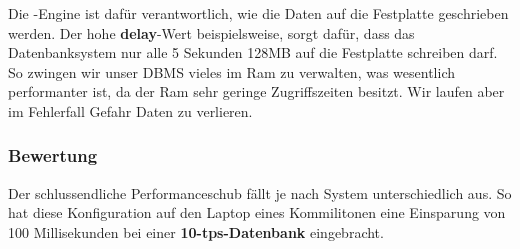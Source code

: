 Die -Engine ist dafür verantwortlich, wie die Daten auf die
Festplatte geschrieben werden. Der hohe \textbf{delay}-Wert beispielsweise, sorgt
dafür, dass das Datenbanksystem nur alle 5 Sekunden 128MB auf die Festplatte
schreiben darf. So zwingen wir unser DBMS vieles im Ram zu verwalten, was
wesentlich performanter ist, da der Ram sehr geringe Zugriffszeiten besitzt. Wir
laufen aber im Fehlerfall Gefahr Daten zu verlieren.

\subsubsection*{Bewertung}
Der schlussendliche Performanceschub fällt je nach System unterschiedlich aus.
So hat diese Konfiguration auf den Laptop eines Kommilitonen eine Einsparung von 100
Millisekunden bei einer \textbf{10-tps-Datenbank} eingebracht.

\clearpage

% 
% 
% 

